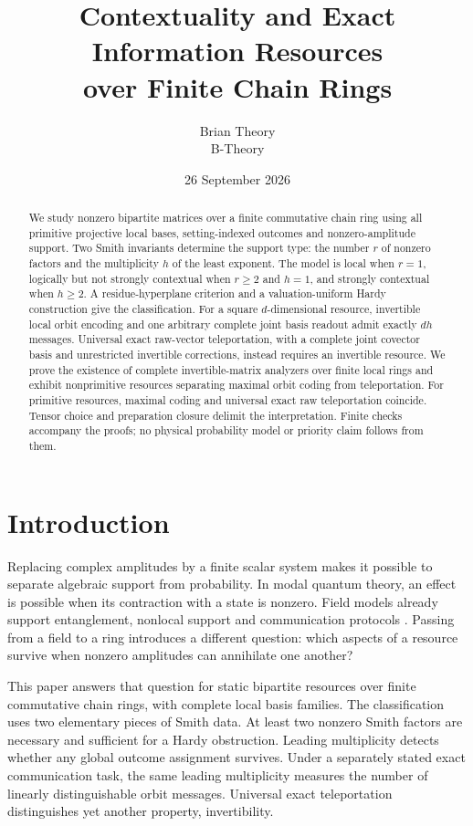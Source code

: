 \documentclass[11pt]{article}
\title{Contextuality and Exact Information Resources\\over Finite Chain Rings}
\author{Brian Theory\\\small B-Theory}
\date{26 September 2026}
\theoremstyle{definition}\newtheorem{definition}[theorem]{Definition}
\theoremstyle{remark}\newtheorem{remark}[theorem]{Remark}
\begin{document}
\maketitle
\begin{abstract}
We study nonzero bipartite matrices over a finite commutative chain ring using all primitive projective local bases, setting-indexed outcomes and nonzero-amplitude support. Two Smith invariants determine the support type: the number $r$ of nonzero factors and the multiplicity $h$ of the least exponent. The model is local when $r=1$, logically but not strongly contextual when $r\geq2$ and $h=1$, and strongly contextual when $h\geq2$. A residue-hyperplane criterion and a valuation-uniform Hardy construction give the classification. For a square $d$-dimensional resource, invertible local orbit encoding and one arbitrary complete joint basis readout admit exactly $dh$ messages. Universal exact raw-vector teleportation, with a complete joint covector basis and unrestricted invertible corrections, instead requires an invertible resource. We prove the existence of complete invertible-matrix analyzers over finite local rings and exhibit nonprimitive resources separating maximal orbit coding from teleportation. For primitive resources, maximal coding and universal exact raw teleportation coincide. Tensor choice and preparation closure delimit the interpretation. Finite checks accompany the proofs; no physical probability model or priority claim follows from them.
\end{abstract}

\section{Introduction}
Replacing complex amplitudes by a finite scalar system makes it possible to separate algebraic support from probability. In modal quantum theory, an effect is possible when its contraction with a state is nonzero. Field models already support entanglement, nonlocal support and communication protocols \cite{Schumacher2010,Schumacher2012}. Passing from a field to a ring introduces a different question: which aspects of a resource survive when nonzero amplitudes can annihilate one another?

This paper answers that question for static bipartite resources over finite commutative chain rings, with complete local basis families. The classification uses two elementary pieces of Smith data. At least two nonzero Smith factors are necessary and sufficient for a Hardy obstruction. Leading multiplicity detects whether any global outcome assignment survives. Under a separately stated exact communication task, the same leading multiplicity measures the number of linearly distinguishable orbit messages. Universal exact teleportation distinguishes yet another property, invertibility.
\end{document}
